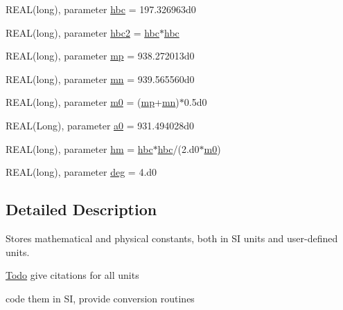 \begin{DoxyCompactItemize}
\item 
REAL(long), parameter \hyperlink{namespacephys__cons_a3f47589553abc71257ab3e88ef7bbb39}{hbc} = 197.326963d0
\item 
REAL(long), parameter \hyperlink{namespacephys__cons_af78d210174277076bb64ff4403f8c9fd}{hbc2} = \hyperlink{namespacephys__cons_a3f47589553abc71257ab3e88ef7bbb39}{hbc}$\ast$\hyperlink{namespacephys__cons_a3f47589553abc71257ab3e88ef7bbb39}{hbc}
\item 
REAL(long), parameter \hyperlink{namespacephys__cons_ae2a4cb4e421fe399f19d0729b5617fed}{mp} = 938.272013d0
\item 
REAL(long), parameter \hyperlink{namespacephys__cons_ad68aaba74b75e1e13f1367c1eb0904c1}{mn} = 939.565560d0
\item 
REAL(long), parameter \hyperlink{namespacephys__cons_a2e392d52d36b5c1db0d17928aa40f35b}{m0} = (\hyperlink{namespacephys__cons_ae2a4cb4e421fe399f19d0729b5617fed}{mp}+\hyperlink{namespacephys__cons_ad68aaba74b75e1e13f1367c1eb0904c1}{mn})$\ast$0.5d0
\item 
REAL(Long), parameter \hyperlink{namespacephys__cons_a02e8bb2c808e0085a317bf36ff79ae2a}{a0} = 931.494028d0
\item 
REAL(long), parameter \hyperlink{namespacephys__cons_ad97ad749ef4f8f66c56a0facb7394cb5}{hm} = \hyperlink{namespacephys__cons_a3f47589553abc71257ab3e88ef7bbb39}{hbc}$\ast$\hyperlink{namespacephys__cons_a3f47589553abc71257ab3e88ef7bbb39}{hbc}/(2.d0$\ast$\hyperlink{namespacephys__cons_a2e392d52d36b5c1db0d17928aa40f35b}{m0})
\item 
REAL(long), parameter \hyperlink{namespacephys__cons_a553e3e17652770308e6bffcb8fcb5a95}{deg} = 4.d0
\end{DoxyCompactItemize}


\subsection{Detailed Description}
Stores mathematical and physical constants, both in SI units and user-\/defined units. \begin{Desc}
\item[\hyperlink{todo__todo000001}{Todo}]give citations for all units 

code them in SI, provide conversion routines \end{Desc}


